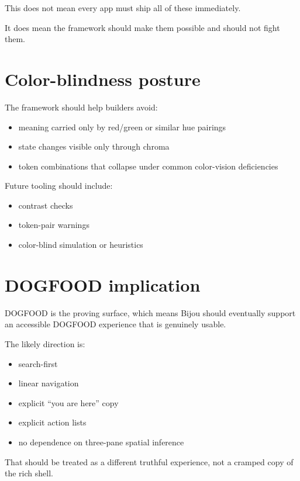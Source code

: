 This does not mean every app must ship all of these immediately.

It does mean the framework should make them possible and should not fight them.

\section{Color-blindness posture}\label{record-032-color-blindness-posture}

The framework should help builders avoid:

\begin{itemize}
\tightlist
\item
  meaning carried only by red/green or similar hue pairings
\item
  state changes visible only through chroma
\item
  token combinations that collapse under common color-vision deficiencies
\end{itemize}

Future tooling should include:

\begin{itemize}
\tightlist
\item
  contrast checks
\item
  token-pair warnings
\item
  color-blind simulation or heuristics
\end{itemize}

\section{DOGFOOD implication}\label{record-032-dogfood-implication}

DOGFOOD is the proving surface, which means Bijou should eventually support an accessible DOGFOOD experience that is genuinely usable.

The likely direction is:

\begin{itemize}
\tightlist
\item
  search-first
\item
  linear navigation
\item
  explicit ``you are here'' copy
\item
  explicit action lists
\item
  no dependence on three-pane spatial inference
\end{itemize}

That should be treated as a different truthful experience, not a cramped copy of the rich shell.

